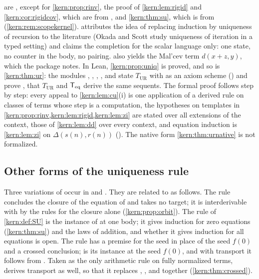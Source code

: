 \begin{remark}
\label{kern:rem:ur-sources}
 are ,
except for \cref{kern:prop:rinv}, the proof of \cref{kern:lem:rigid} and
\cref{kern:cor:rigidcov}, which are from , and
\cref{kern:thm:su}, which is from 
(\cref{kern:rem:scopekernel}).   attributes the
idea of replacing induction by uniqueness of recursion to the literature
(Okada and Scott study uniqueness of iteration in a typed setting) and
claims the completion for the scalar language only: one state, no counter
in the body, no pairing.   also yields the Mal'cev
term $d(x+z,y)$, which the package notes.  In Lean,
\cref{kern:prop:uniq} is proved, and so is \cref{kern:thm:ur}: the modules
, , , ,
 and  state $T_{\mathrm{UR}}$ with
 as an axiom scheme () and prove
, that $T_{\mathrm{UR}}$ and $\mathsf{T}_{\mathrm{eq}}$ derive the same
sequents.  The formal proof follows
 step by step: every appeal
to \cref{kern:lem:cu}(i) is one application of a derived rule on classes of
terms whose step is a computation, the hypotheses on templates in
\cref{kern:prop:rinv,kern:lem:rigid,kern:lem:zi} are stated over all
extensions of the context, those of \cref{kern:lem:dd} over every context,
and equation induction is \cref{kern:lem:zi} on $\Delta(s(n),r(n))$
().  The native form \cref{kern:thm:urnative} is not
formalized.
\end{remark}

\subsection{Other forms of the uniqueness rule}
\label{kern:sec:urforms}

Three variations of  occur in  and
.  They are related to  as follows.
The rule  concludes the closure of the equation of
 and takes no target; it is interderivable with 
by the rules for the closure alone (\cref{kern:prop:orbit}).  The rule
 of \cref{kern:def:SU} is the instance of  at one
body; it gives induction for zero equations (\cref{kern:thm:su}) and the
laws of addition, and whether it gives induction for all equations is open.
The rule  has a premise for the seed in place of the seed
$f(0)$ and a crossed conclusion;  is its instance at the seed
$f(0)$, and with transport it follows from .  Taken as the
only arithmetic rule on fully normalized terms,  derives
transport as well, so that it replaces , ,
 and  together (\cref{kern:thm:crossed}).

